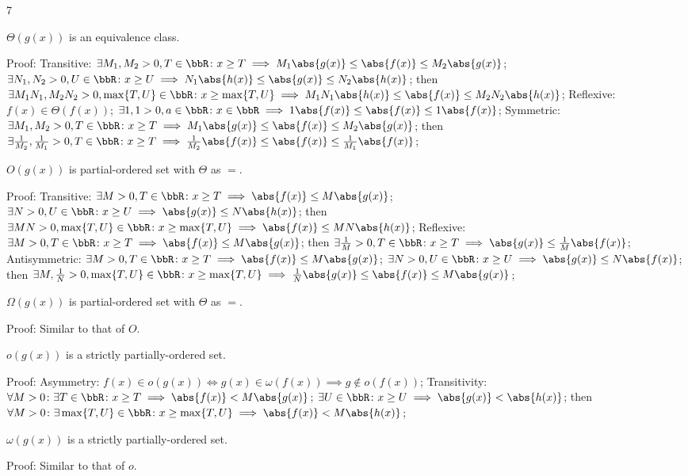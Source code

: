 \documentclass[a4paper,10pt]{extarticle}
\begin{document}
\begin{multicols}{7}

$\Theta(g(x))$ is an equivalence class.

Proof:
Transitive:
\(\exists M_1,M_2>0,T\in\bbR\colon x\ge T\implies M_1\abs{g(x)}\le\abs{f(x)}\le M_2\abs{g(x)}\); 
\(\exists N_1,N_2>0,U\in\bbR\colon x\ge U\implies N_1\abs{h(x)}\le\abs{g(x)}\le N_2\abs{h(x)}\); 
then
\(\exists M_1N_1,M_2N_2>0,\max\{T,U\}\in\bbR\colon x\ge \max\{T,U\}\implies M_1N_1\abs{h(x)}\le\abs{f(x)}\le M_2N_2\abs{h(x)}\); 
Reflexive:
\(f(x)\in\Theta(f(x))\); 
\(\exists 1,1>0,a\in\bbR\colon x\in\bbR\implies 1\abs{f(x)}\le\abs{f(x)}\le 1\abs{f(x)}\); 
Symmetric:
\(\exists M_1,M_2>0,T\in\bbR\colon x\ge T\implies M_1\abs{g(x)}\le\abs{f(x)}\le M_2\abs{g(x)}\); 
then
\(\exists \frac{1}{M_2},\frac{1}{M_1}>0,T\in\bbR\colon x\ge T\implies \frac{1}{M_2}\abs{f(x)}\le\abs{f(x)}\le\frac{1}{M_1}\abs{f(x)}\); 


$O(g(x))$ is partial-ordered set with $\Theta$ as $=$.

Proof:
Transitive:
\(\exists M>0,T\in\bbR\colon x\ge T\implies\abs{f(x)}\le M\abs{g(x)}\); 
\(\exists N>0,U\in\bbR\colon x\ge U\implies\abs{g(x)}\le N\abs{h(x)}\); 
then
\(\exists MN>0,\max\{T,U\}\in\bbR\colon x\ge\max\{T,U\}\implies\abs{f(x)}\le MN\abs{h(x)}\); 
Reflexive:
\(\exists M>0,T\in\bbR\colon x\ge T\implies\abs{f(x)}\le M\abs{g(x)}\); 
then
\(\exists \frac{1}{M}>0,T\in\bbR\colon x\ge T\implies\abs{g(x)}\le \frac{1}{M}\abs{f(x)}\); 
Antisymmetric:
\(\exists M>0,T\in\bbR\colon x\ge T\implies\abs{f(x)}\le M\abs{g(x)}\); 
\(\exists N>0,U\in\bbR\colon x\ge U\implies\abs{g(x)}\le N\abs{f(x)}\); 
then
\(\exists M,\frac{1}{N}>0,\max\{T,U\}\in\bbR\colon x\ge \max\{T,U\}\implies\frac{1}{N}\abs{g(x)}\le\abs{f(x)}\le M\abs{g(x)}\); 


$\Omega(g(x))$ is partial-ordered set with $\Theta$ as $=$.

Proof:
Similar to that of $O$.


$o(g(x))$ is a strictly partially-ordered set.

Proof:
Asymmetry:
\(f(x)\in o(g(x))\iff g(x)\in\omega(f(x))\implies g\notin o(f(x))\); 
Transitivity:
\(\forall M>0\colon\exists T\in\bbR\colon x\ge T\implies\abs{f(x)}<M\abs{g(x)}\); 
\(\exists U\in\bbR\colon x\ge U\implies\abs{g(x)}<\abs{h(x)}\); 
then
\(\forall M>0\colon\exists \max\{T,U\}\in\bbR\colon x\ge \max\{T,U\}\implies\abs{f(x)}<M\abs{h(x)}\); 


$\omega(g(x))$ is a strictly partially-ordered set.

Proof:
Similar to that of $o$.



\end{multicols}
\end{document}
